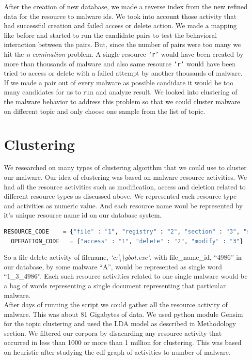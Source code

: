 After the creation of new database, we made a reverse index from the new refined data for the resource to malware ids.
We took into account those activity that had successful creation and failed access or delete action. We made a mapping like before and started to run the candidate pairs to test the behavioral interaction between the pairs. But, since the number of pairs were too many we hit the \emph{n-comination} problem.
A single resource \texttt{`r'} would have been created by more than thousands of malware and also same resource \texttt{`r'} would have been tried to access or delete with a failed attempt by another thousands of malware. If we made a pair out of every malware as possible candidate it would be too many candidates for us to run and analyze result.
We looked into clustering of the malware behavior to address this problem so that we could cluster malware on different topic and only choose one sample from the list of topic.
\section{Clustering}
\label{sec:Clustering}
We researched on many types of clustering algorithm that we could use to cluster our malware. Our idea of clustering was based on malware resource activities.
We had all the resource activities such as modification, access and deletion related to different resource types as discussed above.
We represented each resource type and activities as numeric value. And each resource name woul be represented by it's unique resource name id on our database system.
\begin{lstlisting}[language=python,caption={Numeric codes given to resource and operation},label={lbl:numericode}]
  RESOURCE_CODE    = {"file" : "1", "registry" : "2", "section" : "3", "service" : "4", "driver" : "5", "sync" : "6", "process" : "7", "job" : "8"}
  OPERATION_CODE   = {"access" : "1", "delete" : "2", "modify" : "3"}
\end{lstlisting}
So a file delete activity of filename, \textit{`c:\textbackslash\textbackslash{}gbot.exe'}, with file\_name\_id, ``4986'' in our database, by some malware ``A'', would be represented as single word ``1\_3\_4986''. Each such resource activities related to one single malware would be a bag of words representing  a single document representing that particular malware.\\
After days of running the script we could gather all the resource activity of  malware. This was about 81 Gigabytes of data.
We used python module Gensim~\cite[Gensim]{gensim}  for the topic clustering and used the LDA model as described in Methodology section. We filtered our corpora by disacarding any resource activity that occurred in less than 1000 or more than 1 million for clustering.
This was based on heuristic after studying the cdf graph of activities to number of malware.

